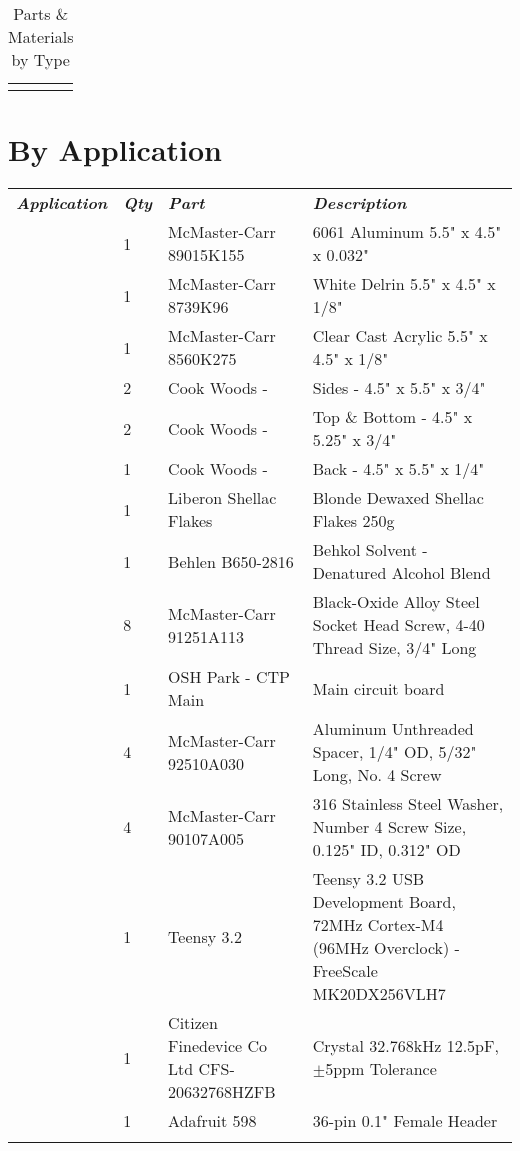 \begin{longtabu}{X[1,c,m] X[6,c,m] X[9,l,m]}
  \bhrule
\caption{Parts \& Materials by Type}
\end{longtabu}

\pagebreak
\section{By Application}

\tiny
{}
\begin{longtabu}{X[3,c,m] X[1,c,m] X[3,c,m] X[5,l,m]}
  \thrule
  \textit{\bfseries\normalsize Application} & \textit{\bfseries\normalsize Qty} & \textit{\bfseries\normalsize Part} & \textit{\bfseries\normalsize Description} \\ \mrule

   & 1 & McMaster-Carr 89015K155 & 6061 Aluminum 5.5" x 4.5" x 0.032" \\
  & 1 & McMaster-Carr 8739K96 & White Delrin 5.5" x 4.5" x 1/8" \\
  & 1 & McMaster-Carr 8560K275 & Clear Cast Acrylic 5.5" x 4.5" x 1/8" \\
  & 2 & Cook Woods - \wood{} & Sides - 4.5" x 5.5" x 3/4" \\
  & 2 & Cook Woods - \wood{} & Top \& Bottom - 4.5" x 5.25" x 3/4" \\
  & 1 & Cook Woods - \wood{} & Back - 4.5" x 5.5" x 1/4" \\
  & 1 & Liberon Shellac Flakes & Blonde Dewaxed Shellac Flakes 250g \\
  & 1 & Behlen B650-2816 & Behkol Solvent - Denatured Alcohol Blend \\
  & 8 & McMaster-Carr 91251A113 & Black-Oxide Alloy Steel Socket Head Screw, 4-40 Thread Size, 3/4" Long \\ \mrule

   & 1 & OSH Park - CTP Main & Main circuit board \\
  & 4 & McMaster-Carr 92510A030 & Aluminum Unthreaded Spacer, 1/4" OD, 5/32" Long, No. 4 Screw \\
  & 4 & McMaster-Carr 90107A005 & 316 Stainless Steel Washer, Number 4 Screw Size, 0.125" ID, 0.312" OD \\ \mrule

   & 1 & Teensy 3.2 & Teensy 3.2 USB Development Board, 72MHz Cortex-M4 (96MHz Overclock) - FreeScale MK20DX256VLH7 \\
  & 1 & Citizen Finedevice Co Ltd CFS-20632768HZFB & Crystal 32.768kHz 12.5pF, $\pm$5ppm Tolerance \\
  & 1 & Adafruit 598 & 36-pin 0.1" Female Header \\ \mrule


\end{longtabu}
